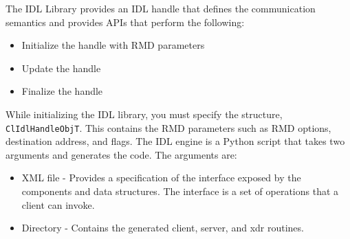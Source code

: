 \begin{flushleft}
The IDL Library provides an IDL handle that defines the communication semantics and provides APIs that perform the following: 
\begin{itemize}
\item
Initialize the handle with RMD parameters
\item
Update the handle
\item
Finalize the handle
\end{itemize}

While initializing the IDL library, you must specify the structure, {\tt{ClIdlHandleObjT}}. This contains the RMD parameters such as RMD options, 
destination address, and flags. The IDL engine is a Python script that takes two arguments and generates the code. The arguments are:
\begin{itemize}
\item
XML file - Provides a specification of the interface exposed by the components and data structures. The interface is a set of operations that a client
can invoke.
\item
Directory - Contains the generated client, server, and xdr routines.
\end{itemize}


\end{flushleft}
